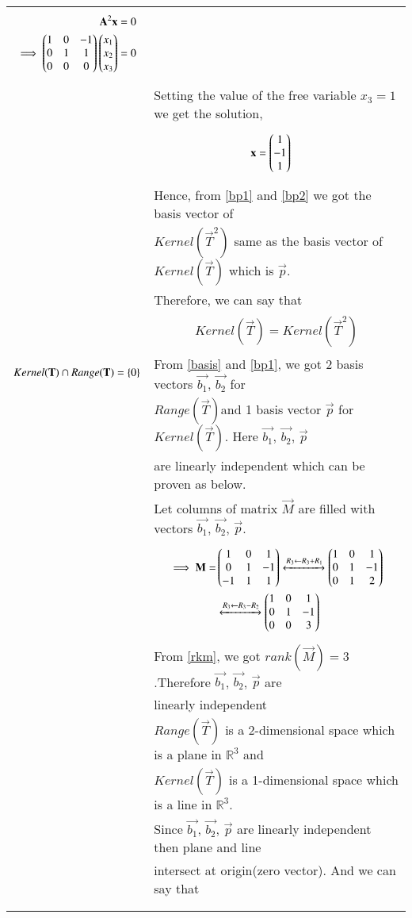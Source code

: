 \documentclass[journal,12pt]{IEEEtran}
\begin{document}
\begin{longtable}{|l|l|}
{\begin{align}
\mathbf{A}^2\mathbf{x} &= 0\\
\implies\begin{pmatrix}1&0&-1\\0&1&1\\0&0&0\end{pmatrix}\begin{pmatrix}x_1\\x_2\\x_3\end{pmatrix} &= 0
\end{align}}\\&Setting the value of the free variable $x_3 = 1$ we get the solution,\\&\parbox{11cm}{
\begin{align}
\mathbf{x} &= \begin{pmatrix}1\\-1\\1\end{pmatrix}\label{bp2}
\end{align}}\\&Hence, from \eqref{bp1} and \eqref{bp2} we got the basis vector of\\&$Kernel(\vec{T}^2)$ same as the basis vector of $Kernel(\vec{T})$ which is $\vec{p}$.\\&Therefore, we can say that\\&\parbox{11cm}{\begin{align}
    Kernel(\vec{T})=Kernel(\vec{T}^2)\label{exp2}
\end{align}}\\
\hline
$Kernel(\mathbf{T})\cap Range(\mathbf{T})=\left\{0\right\}$&From \eqref{basis} and \eqref{bp1}, we got 2 basis vectors $\vec{b_1}$, $\vec{b_2}$ for \\&$Range(\vec{T})$and 1 basis vector $\vec{p}$ for $Kernel(\vec{T})$. Here $\vec{b_1}$, $\vec{b_2}$, $\vec{p}$\\&are linearly independent which can be proven as below.\\&Let columns of matrix $\vec{M}$ are filled with vectors $\vec{b_1}$, $\vec{b_2}$, $\vec{p}$.\\&\parbox{11cm}{\begin{align}
    \implies\mathbf{M}=&\begin{pmatrix}1&0&1\\0&1&-1\\-1&1&1\end{pmatrix}\xleftrightarrow[]{R_3\leftarrow R_3+R_1}\begin{pmatrix}1&0&1\\0&1&-1\\0&1&2\end{pmatrix}\\
    &\xleftrightarrow[]{R_3\leftarrow R_3-R_2}\begin{pmatrix}1&0&1\\0&1&-1\\0&0&3\end{pmatrix}\label{rkm}
\end{align}}\\&From \eqref{rkm}, we got $rank(\vec{M})=3$.Therefore $\vec{b_1}$, $\vec{b_2}$, $\vec{p}$ are\\&linearly independent\\&$Range(\vec{T})$ is a 2-dimensional space which is a plane in $\mathbb{R}^3$ and\\&$Kernel(\vec{T})$ is a 1-dimensional space which is a line in $\mathbb{R}^3$.\\&Since $\vec{b_1}$, $\vec{b_2}$, $\vec{p}$ are linearly independent then plane and line \\&intersect at origin(zero vector). And we can say that\\&\parbox{11cm}{\begin{align}

\end{align}}
\end{longtable}
\end{document}
